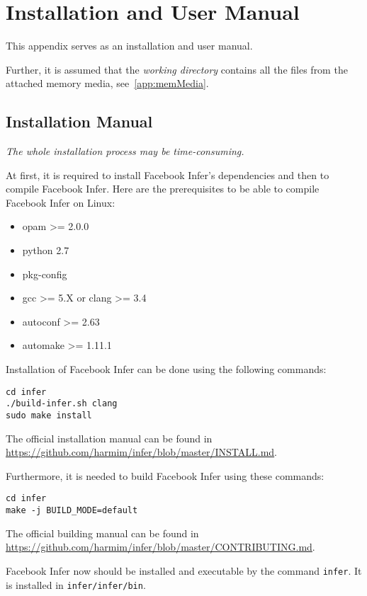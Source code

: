 \chapter{Installation and User Manual}
\label{app:man}

This appendix serves as an installation and user manual. 

Further, it is assumed that the \emph{working directory} contains all the 
files from the attached memory media, see~\ref{app:memMedia}.


\section*{Installation Manual}

\emph{The whole installation process may be time-consuming.}

At first, it is required to install Facebook Infer's dependencies and then
to compile Facebook Infer. Here are the prerequisites to be able to compile
Facebook Infer on Linux:
\begin{itemize}
    \item opam >= 2.0.0
    \item python 2.7
    \item pkg-config
    \item gcc >= 5.X or clang >= 3.4
    \item autoconf >= 2.63
    \item automake >= 1.11.1
\end{itemize}

Installation of Facebook Infer can be done using the following commands:
\begin{lstlisting}[style=bash]
cd infer
./build-infer.sh clang
sudo make install
\end{lstlisting}
The official installation manual can be found in
\url{https://github.com/harmim/infer/blob/master/INSTALL.md}.

Furthermore, it is needed to build Facebook Infer using these commands:
\begin{lstlisting}[style=bash]
cd infer
make -j BUILD_MODE=default
\end{lstlisting}
The official building manual can be found in
\url{https://github.com/harmim/infer/blob/master/CONTRIBUTING.md}.

Facebook Infer now should be installed and executable by the command
\texttt{infer}. It is installed in \texttt{infer/infer/bin}.


